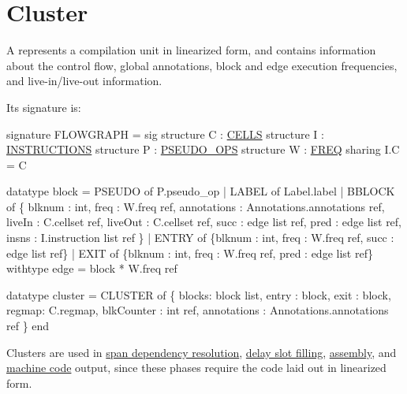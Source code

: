 \section{Cluster}

A 
represents a compilation unit in linearized form,
and contains information about the control flow, global annotations, 
block and edge execution frequencies, and live-in/live-out information.

Its signature is:
\begin{SML}
signature FLOWGRAPH = sig
  structure C : \href{cells.html}{CELLS}
  structure I : \href{instructions.html}{INSTRUCTIONS}
  structure P : \href{pseudo-ops.html}{PSEUDO_OPS}
  structure W : \href{freq.html}{FREQ}
     sharing I.C = C

  datatype block =
      PSEUDO of P.pseudo_op
    | LABEL of Label.label
    | BBLOCK of
        \{ blknum      : int,
          freq        : W.freq ref,
          annotations : Annotations.annotations ref,
	  liveIn      : C.cellset ref,
	  liveOut     : C.cellset ref,
	  succ 	      : edge list ref,
	  pred 	      : edge list ref,
	  insns	      : I.instruction list ref
        \}
    | ENTRY of 
        \{blknum : int, freq : W.freq ref, succ : edge list ref\}
    | EXIT of 
        \{blknum : int, freq : W.freq ref, pred : edge list ref\}
  withtype edge = block * W.freq ref

  datatype cluster = 
      CLUSTER of \{
        blocks: block list, 
        entry : block,
        exit  : block,	  
        regmap: C.regmap,
        blkCounter : int ref,
        annotations : Annotations.annotations ref
      \}
end
\end{SML}

Clusters are used in
\href{span-dep.html}{span dependency resolution}, 
\href{delayslots.html}{delay slot filling},
\href{asm.html}{assembly}, 
and \href{mc.html}{machine code} 
output, since these phases require the code laid out in linearized form.
